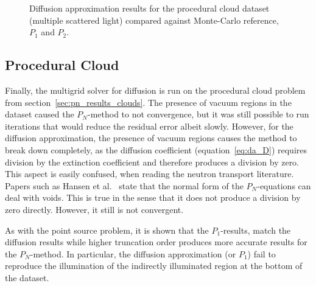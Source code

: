 \begin{figure}[h]
\caption{Diffusion approximation results for the procedural cloud dataset (multiple scattered light) compared against Monte-Carlo reference, $P_1$ and $P_2$.}
\label{fig:da_results_nebulae_1}
\end{figure}

\subsection{Procedural Cloud}
\label{sec:da_results_clouds}

Finally, the multigrid solver for diffusion is run on the procedural cloud problem from section~\ref{sec:pn_results_clouds}. The presence of vacuum regions in the dataset caused the $P_N$-method to not convergence, but it was still possible to run iterations that would reduce the residual error albeit slowly. However, for the diffusion approximation, the presence of vacuum regions causes the method to break down completely, as the diffusion coefficient (equation~\ref{eq:da_D}) requires division by the extinction coefficient and therefore produces a division by zero. This aspect is easily confused, when reading the neutron transport literature. Papers such as Hansen et al.~\cite{Hansen14} state that the normal form of the $P_N$-equations can deal with voids. This is true in the sense that it does not produce a division by zero directly. However, it still is not convergent.

As with the point source problem, it is shown that the $P_1$-results, match the diffusion results while higher truncation order produces more accurate results for the $P_N$-method. In particular, the diffusion approximation (or $P_1$) fail to reproduce the illumination of the indirectly illuminated region at the bottom of the dataset.
